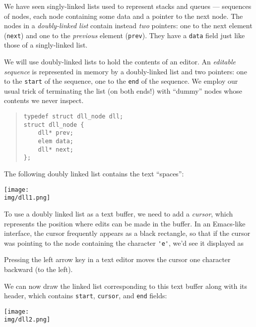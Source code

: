 \documentclass[12pt]{exam}
\begin{document}
We have seen singly-linked lists used to represent stacks and queues ---
sequences of nodes, each node containing some data and a pointer to the next
node.  The nodes in a \emph{doubly-linked list} contain instead \emph{two}
pointers: one to the next element (\lstinline'next') and one to the
\emph{previous} element (\lstinline'prev').  They have a \lstinline'data'
field just like those of a singly-linked list.

We will use doubly-linked lists to hold the contents of an editor.
An \emph{editable sequence} is represented in memory by a doubly-linked list
and two pointers: one to the \lstinline'start' of the sequence, one to
the \lstinline'end' of the sequence.  We employ our usual trick of
terminating the list (on both ends!) with ``dummy'' nodes whose
contents we never inspect.
\begin{quote}
\begin{lstlisting}[numbers=none]
typedef struct dll_node dll;
struct dll_node {
    dll* prev;
    elem data;
    dll* next;
};
\end{lstlisting}
\end{quote}
The following doubly linked list contains the text
``spaces'':
\begin{center}
  \texttt{[image: \\img/dll1.png]}
\end{center}
To use a doubly linked list as a text buffer, we need to add a
\emph{cursor}, which represents the position where edits can be made
in the buffer. In an Emacs-like interface, the cursor frequently
appears as a black rectangle, so that if the cursor was pointing to the
node containing the character \lstinline"'e'", we'd see it displayed as
\begin{center}
\end{center}
Pressing the left arrow key in a text editor moves the cursor one
character backward (to the left).
\begin{center}
\end{center}
We can now draw the linked list corresponding to this text buffer
along with its header, which contains \lstinline'start',
\lstinline'cursor', and \lstinline'end' fields:
\begin{center}
  \texttt{[image: \\img/dll2.png]}
\end{center}
\end{document}

